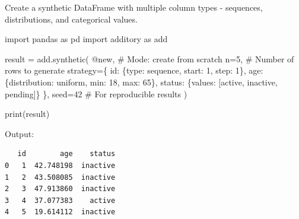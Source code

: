 \documentclass[
  letterpaper,
]{scrbook}
\newenvironment{Shaded}{\begin{snugshade}}{\end{snugshade}}
\newcommand{\BuiltInTok}[1]{\textcolor[rgb]{0.00,0.23,0.31}{#1}}
\newcommand{\CommentTok}[1]{\textcolor[rgb]{0.37,0.37,0.37}{#1}}
\newcommand{\DecValTok}[1]{\textcolor[rgb]{0.68,0.00,0.00}{#1}}
\newcommand{\ImportTok}[1]{\textcolor[rgb]{0.00,0.46,0.62}{#1}}
\newcommand{\NormalTok}[1]{\textcolor[rgb]{0.00,0.23,0.31}{#1}}
\newcommand{\OperatorTok}[1]{\textcolor[rgb]{0.37,0.37,0.37}{#1}}
\newcommand{\StringTok}[1]{\textcolor[rgb]{0.13,0.47,0.30}{#1}}
\begin{document}
Create a synthetic DataFrame with multiple column types - sequences,
distributions, and categorical values.

\begin{Shaded}
\begin{Highlighting}[]
\ImportTok{import}\NormalTok{ pandas }\ImportTok{as}\NormalTok{ pd}
\ImportTok{import}\NormalTok{ additory }\ImportTok{as}\NormalTok{ add}

\NormalTok{result }\OperatorTok{=}\NormalTok{ add.synthetic(}
    \StringTok{\textquotesingle{}@new\textquotesingle{}}\NormalTok{,                    }\CommentTok{\# Mode: create from scratch}
\NormalTok{    n}\OperatorTok{=}\DecValTok{5}\NormalTok{,                       }\CommentTok{\# Number of rows to generate}
\NormalTok{    strategy}\OperatorTok{=}\NormalTok{\{}
        \StringTok{\textquotesingle{}id\textquotesingle{}}\NormalTok{: \{}\StringTok{\textquotesingle{}type\textquotesingle{}}\NormalTok{: }\StringTok{\textquotesingle{}sequence\textquotesingle{}}\NormalTok{, }\StringTok{\textquotesingle{}start\textquotesingle{}}\NormalTok{: }\DecValTok{1}\NormalTok{, }\StringTok{\textquotesingle{}step\textquotesingle{}}\NormalTok{: }\DecValTok{1}\NormalTok{\},}
        \StringTok{\textquotesingle{}age\textquotesingle{}}\NormalTok{: \{}\StringTok{\textquotesingle{}distribution\textquotesingle{}}\NormalTok{: }\StringTok{\textquotesingle{}uniform\textquotesingle{}}\NormalTok{, }\StringTok{\textquotesingle{}min\textquotesingle{}}\NormalTok{: }\DecValTok{18}\NormalTok{, }\StringTok{\textquotesingle{}max\textquotesingle{}}\NormalTok{: }\DecValTok{65}\NormalTok{\},}
        \StringTok{\textquotesingle{}status\textquotesingle{}}\NormalTok{: \{}\StringTok{\textquotesingle{}values\textquotesingle{}}\NormalTok{: [}\StringTok{\textquotesingle{}active\textquotesingle{}}\NormalTok{, }\StringTok{\textquotesingle{}inactive\textquotesingle{}}\NormalTok{, }\StringTok{\textquotesingle{}pending\textquotesingle{}}\NormalTok{]\}}
\NormalTok{    \},}
\NormalTok{    seed}\OperatorTok{=}\DecValTok{42}                    \CommentTok{\# For reproducible results}
\NormalTok{)}

\BuiltInTok{print}\NormalTok{(result)}
\end{Highlighting}
\end{Shaded}

Output:

\begin{verbatim}
   id        age    status
0   1  42.748198  inactive
1   2  43.508085  inactive
2   3  47.913860  inactive
3   4  37.077383    active
4   5  19.614112  inactive
\end{verbatim}
\end{document}
